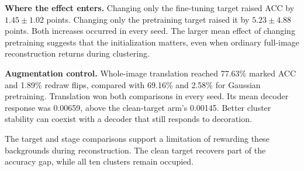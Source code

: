 \textbf{Where the effect enters.} Changing only the fine-tuning target raised ACC by $1.45\pm1.02$ points. Changing only the pretraining target raised it by $5.23\pm4.88$ points. Both increases occurred in every seed. The larger mean effect of changing pretraining suggests that the initialization matters, even when ordinary full-image reconstruction returns during clustering.

\textbf{Augmentation control.} Whole-image translation reached 77.63\% marked ACC and 1.89\% redraw flips, compared with 69.16\% and 2.58\% for Gaussian pretraining. Translation won both comparisons in every seed. Its mean decoder response was 0.00659, above the clean-target arm's 0.00145. Better cluster stability can coexist with a decoder that still responds to decoration.

The target and stage comparisons support a limitation of rewarding these backgrounds during reconstruction. The clean target recovers part of the accuracy gap, while all ten clusters remain occupied.
